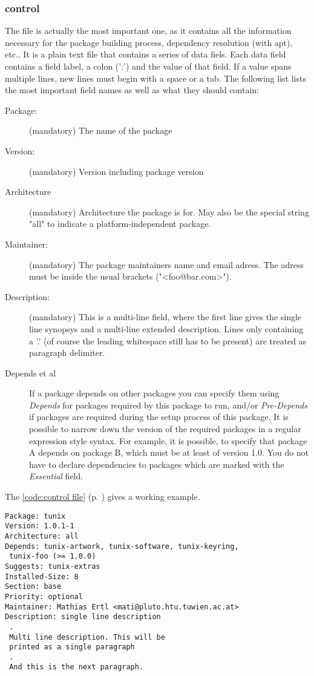 \subsubsection{control}
\label{control}
The file  is actually the most important one, as it
contains all the information necessary for the package building process,
dependency resolution (with apt), etc.. It is a plain text file that contains a
series of data fiels. Each data field contains a field label, a colon (':') and
the value of that field. If a value spans multiple lines, new lines must begin
with a space or a tab. The following list lists the most important field names
as well as what they should contain:
\begin{description}
  \item[Package:] (mandatory) The name of the package
  \item[Version:] (mandatory) Version including package version
  \item[Architecture] (mandatory) Architecture the package is for. May also be
    the special string "all" to indicate a platform-independent package.
  \item[Maintainer:] (mandatory) The package maintainers name and email adress.
    The adress must be inside the usual brackets ("<foo@bar.com>").
  \item[Description:] (mandatory) This is a multi-line field, where the first
    line gives the single line synopsys and a multi-line extended description.
    Lines only containing a '.' (of course the leading whitespace still has to
    be present) are treated as paragraph delimiter.
  \item[Depends et al] If a package depends on other packages you can specify
    them using \emph{Depends} for packages required by this package to run,
    and/or \emph{Pre-Depends} if packages are required during the setup process
    of this package. It is possible to narrow down the version of the required
    packages in a regular expression style syntax. For example, it is possible,
    to specify that package A depends on package B, which must be at least of
    version 1.0. You do not have to declare dependencies to packages which are
    marked with the \emph{Essential} field. 
  \end{description}
The \lstlistingname{} \ref{code:control file} (p. \pageref{code:control file})
gives a working example.
\begin{lstlisting}[label=code:control file, caption=Example of a DEBIAN/control
file, float=ht]
Package: tunix
Version: 1.0.1-1
Architecture: all
Depends: tunix-artwork, tunix-software, tunix-keyring,
 tunix-foo (>= 1.0.0)
Suggests: tunix-extras
Installed-Size: 8
Section: base
Priority: optional
Maintainer: Mathias Ertl <mati@pluto.htu.tuwien.ac.at>
Description: single line description
 .
 Multi line description. This will be
 printed as a single paragraph
 .
 And this is the next paragraph.
\end{lstlisting}

